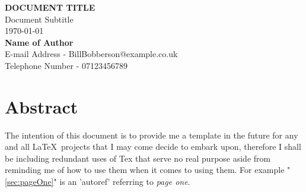 \begin{titlepage}
	\vspace*{\fill}

	\begin{center}
		{\huge{\textbf{DOCUMENT TITLE}}} \\
		\Large{Document Subtitle} \\
		\vspace{1cm}
		\Large{\today} \\
		\vspace{1cm}
		\Large{\textbf{Name of Author}} \\
		\Large{E-mail Address - BillBobberson@example.co.uk} \\
		\Large{Telephone Number - 07123456789} \\
		\vspace*{\fill}
		\pagebreak
	\end{center}

	\vspace*{\fill}

	\section*{Abstract}

	\normalsize{The} intention of this document is to provide me a template in the future for any and all \LaTeX\  projects that I may come decide to embark upon, therefore I shall be including redundant uses of Tex that serve no real purpose aside from reminding me of how to use them when it comes to using them. For example "\autoref{sec:pageOne}" is an 'autoref' referring to \textit{page one}.

	\vspace*{\fill}
\end{titlepage}

\pagebreak
\tableofcontents
\listoffigures
\listoftables
